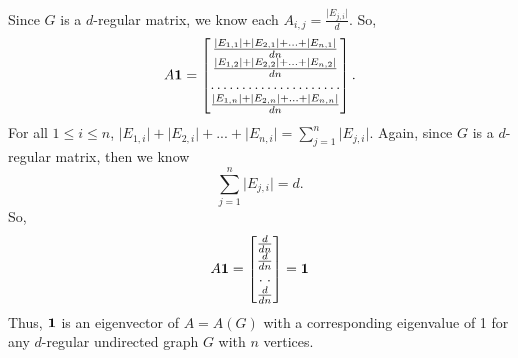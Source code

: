 \documentclass[psamsfonts, 10pt]{amsart}
\theoremstyle{definition}
\theoremstyle{remark}
\numberwithin{equation}{section}
\begin{document}
Since $G$ is a $d$-regular matrix, we know each $A_{i,j} =  \frac{\lvert E_{j,i}\rvert}{d}$. So,
\[
A{\bf 1} =
\begin{bmatrix}
    \frac{\lvert E_{1,1} \rvert +  \lvert E_{2,1} \rvert + ... + \lvert E_{n,1} \rvert  }{dn} \\
     \frac{\lvert E_{1,2} \rvert +  \lvert E_{2,2} \rvert + ... + \lvert E_{n,2} \rvert  }{dn} \\
    \hdotsfor{1} \\
       \frac{\lvert E_{1,n} \rvert +  \lvert E_{2,n} \rvert + ... + \lvert E_{n,n} \rvert  }{dn} \\
\end{bmatrix}.
\]
For all $1 \leq i \leq n$, $\lvert E_{1,i} \rvert +  \lvert E_{2,i} \rvert + ... + \lvert E_{n,i} \rvert = \sum_{j=1}^n \lvert E_{j,i} \rvert$. Again, since $G$ is a $d$-regular matrix, then we know
\[
\sum_{j=1}^n \lvert E_{j,i} \rvert = d.
\]
So,
\[
A{\bf 1} =
\begin{bmatrix}
    \frac{d}{dn} \\
     \frac{d}{dn} \\
    \hdotsfor{1} \\
       \frac{d}{dn} \\
\end{bmatrix}
=
{\bf 1}
\]
Thus, ${\bf 1}$ is an eigenvector of $A=A(G)$ with a corresponding eigenvalue of 1 for any $d$-regular undirected graph $G$ with $n$ vertices.
\end{document}
